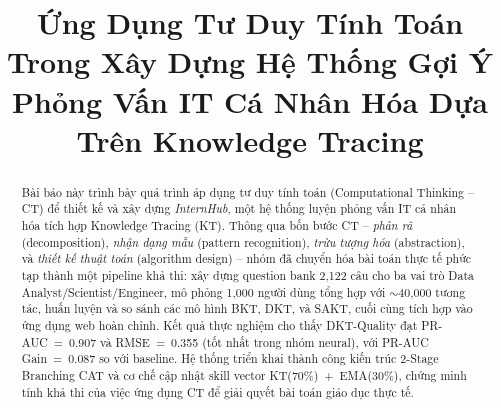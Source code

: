 \documentclass[conference]{IEEEtran}
\newcommand{\sys}{\textit{InternHub}}
\begin{document}
\title{Ứng Dụng Tư Duy Tính Toán Trong Xây Dựng Hệ Thống Gợi Ý Phỏng Vấn IT Cá Nhân Hóa Dựa Trên Knowledge Tracing}

\author{
  \and
  \and
  \and
}

\maketitle

\begin{abstract}
Bài báo này trình bày quá trình áp dụng tư duy tính toán (Computational Thinking -- CT) để thiết kế và xây dựng \sys{}, một hệ thống luyện phỏng vấn IT cá nhân hóa tích hợp Knowledge Tracing (KT). Thông qua bốn bước CT -- \textit{phân rã} (decomposition), \textit{nhận dạng mẫu} (pattern recognition), \textit{trừu tượng hóa} (abstraction), và \textit{thiết kế thuật toán} (algorithm design) -- nhóm đã chuyển hóa bài toán thực tế phức tạp thành một pipeline khả thi: xây dựng question bank 2{,}122 câu cho ba vai trò Data Analyst/Scientist/Engineer, mô phỏng 1{,}000 người dùng tổng hợp với $\sim$40{,}000 tương tác, huấn luyện và so sánh các mô hình BKT, DKT, và SAKT, cuối cùng tích hợp vào ứng dụng web hoàn chỉnh. Kết quả thực nghiệm cho thấy DKT-Quality đạt PR-AUC~=~0.907 và RMSE~=~0.355 (tốt nhất trong nhóm neural), với PR-AUC Gain~=~0.087 so với baseline. Hệ thống triển khai thành công kiến trúc 2-Stage Branching CAT và cơ chế cập nhật skill vector KT(70\%)~+~EMA(30\%), chứng minh tính khả thi của việc ứng dụng CT để giải quyết bài toán giáo dục thực tế.
\end{abstract}
\end{document}
